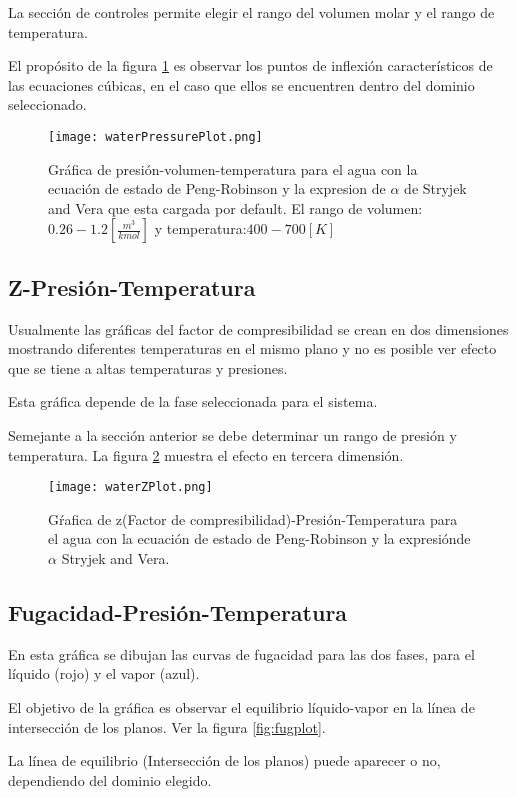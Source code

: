 		La sección de controles permite elegir el rango del volumen molar y el rango de temperatura.
		
		El propósito de la figura \ref{fig:press} es observar los puntos de inflexión característicos de las ecuaciones cúbicas, en el caso que ellos se encuentren dentro del dominio seleccionado.

		\begin{figure}[!h]
			\texttt{[image: waterPressurePlot.png]}
			\caption{Gráfica de presión-volumen-temperatura para el agua con la ecuación de estado de Peng-Robinson y la expresion de $\alpha$ de Stryjek and Vera que esta cargada por default. El rango de volumen: $0.26-1.2 [\frac{m^3}{kmol}]$ y temperatura:$400-700[K]$ }
			\label{fig:press}
		\end{figure}
	\subsection{Z-Presión-Temperatura}\label{subsec:zpt}
		Usualmente las gráficas del factor de compresibilidad se crean en dos dimensiones mostrando diferentes temperaturas en el mismo plano y no es posible ver efecto que se tiene a altas temperaturas y presiones.

		Esta gráfica depende de la fase seleccionada para el sistema.

		Semejante a la sección anterior se debe determinar un rango de presión y temperatura. La figura \ref{fig:zplot} muestra el efecto en tercera dimensión.
		\begin{figure}[!h]
			\texttt{[image: waterZPlot.png]}
			\caption{Gŕafica de z(Factor de compresibilidad)-Presión-Temperatura para el agua con la ecuación de estado de Peng-Robinson y la expresiónde $\alpha$ Stryjek and Vera.}
			\label{fig:zplot}
		\end{figure}
	\subsection{Fugacidad-Presión-Temperatura}\label{subsec:fpt}

		En esta gráfica se dibujan las curvas de fugacidad para las dos fases, para el líquido (rojo) y el vapor (azul).

		El objetivo de la gráfica es observar el equilibrio líquido-vapor en la línea de intersección de los planos. Ver la figura \ref{fig:fugplot}.

		La línea de equilibrio (Intersección de los planos) puede aparecer o no, dependiendo del dominio elegido.

